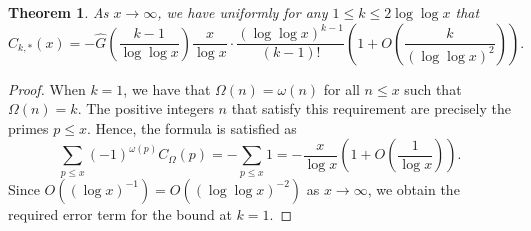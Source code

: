 \documentclass[11pt,reqno,a4letter]{article}
\numberwithin{equation}{section}
\numberwithin{figure}{section}
\numberwithin{table}{section}
\theoremstyle{plain}
\newtheorem{theorem}{Theorem}
\numberwithin{theorem}{section}
\theoremstyle{definition}
\begin{document}
\begin{theorem} 
\label{theorem_CnkSpCasesScaledSummatoryFuncs} 
As $x \rightarrow \infty$, we have uniformly for any $1 \leq k \leq 2\log\log x$ that 
\[
\widehat{C}_{k,\ast}(x) = -\widehat{G}\left(\frac{k-1}{\log\log x}\right) \frac{x}{\log x} \cdot 
     \frac{(\log\log x)^{k-1}}{(k-1)!} \left( 
     1 + O\left(\frac{k}{(\log\log x)^2}\right)\right). 
\]
\end{theorem} 
\begin{proof} 
When $k = 1$, we have that $\Omega(n) = \omega(n)$ for all $n \leq x$ such that $\Omega(n) = k$. 
The positive integers $n$ that satisfy this requirement are precisely the primes $p \leq x$. 
Hence, the formula is satisfied as 
\[
\sum_{p \leq x} (-1)^{\omega(p)} C_{\Omega}(p) = -\sum_{p \leq x} 1 = 
     - \frac{x}{\log x} \left(1 + O\left(\frac{1}{\log x}\right)\right). 
\]
Since $O\left((\log x)^{-1}\right) = O\left((\log\log x)^{-2}\right)$ as 
$x \rightarrow \infty$, we obtain the required error term for the bound at $k = 1$. 


\end{proof}
\end{document}
